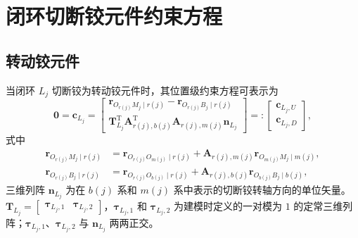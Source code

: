 \section{闭环切断铰元件约束方程}

\subsection{转动铰元件}

当闭环 $L_j$ 切断铰为转动铰元件时，其位置级约束方程可表示为
\begin{equation}\label{eq:10.52}
  \boldsymbol{0} = \boldsymbol{c}_{L_j} = \begin{bmatrix}
    \boldsymbol{r}_{O_{r(j)} M_j \mid r(j)} - \boldsymbol{r}_{O_{r(j)} B_j \mid r(j)} \\[4pt]
    \boldsymbol{T}_{L_j}^{\mathrm{T}} \boldsymbol{A}_{r(j),b(j)}^{\mathrm{T}} \boldsymbol{A}_{r(j),m(j)} \boldsymbol{n}_{L_j}
  \end{bmatrix}
  =: \begin{bmatrix} \boldsymbol{c}_{L_j,U} \\ \boldsymbol{c}_{L_j,D} \end{bmatrix},
\end{equation}
式中
\begin{align}
  \boldsymbol{r}_{O_{r(j)} M_j \mid r(j)} &= \boldsymbol{r}_{O_{r(j)} O_{m(j)} \mid r(j)} + \boldsymbol{A}_{r(j),m(j)} \boldsymbol{r}_{O_{m(j)} M_j \mid m(j)}, \label{eq:10.53} \\
  \boldsymbol{r}_{O_{r(j)} B_j \mid r(j)} &= \boldsymbol{r}_{O_{r(j)} O_{b(j)} \mid r(j)} + \boldsymbol{A}_{r(j),b(j)} \boldsymbol{r}_{O_{b(j)} B_j \mid b(j)}, \label{eq:10.54}
\end{align}
三维列阵 $\boldsymbol{n}_{L_j}$ 为在 $b(j)$ 系和 $m(j)$ 系中表示的切断铰转轴方向的单位矢量。$\boldsymbol{T}_{L_j} = \begin{bmatrix} \boldsymbol{\tau}_{L_j,1} & \boldsymbol{\tau}_{L_j,2} \end{bmatrix}$，$\boldsymbol{\tau}_{L_j,1}$ 和 $\boldsymbol{\tau}_{L_j,2}$ 为建模时定义的一对模为 $1$ 的定常三维列阵；$\boldsymbol{\tau}_{L_j,1}$、$\boldsymbol{\tau}_{L_j,2}$ 与 $\boldsymbol{n}_{L_j}$ 两两正交。

